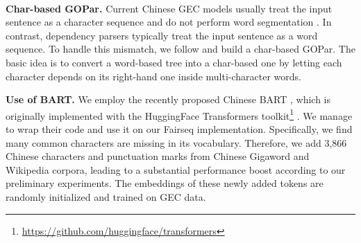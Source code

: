 \documentclass[11pt]{article}
\begin{document}
\begin{table}[tp!]\
\centering
{}
\caption{Statistics of Chinese GEC datasets.}
\label{tab:chinese:dataset}
\end{table} \textbf{Char-based GOPar.} 
Current Chinese GEC models usually treat the input sentence as a character sequence and do not perform word segmentation \cite{zhao2020maskgec}. In contrast, dependency parsers typically treat the input sentence as a word sequence. 
To handle this mismatch, we follow \citet{DBLP:journals/tacl/YanQH20}  and build a char-based GOPar. The basic idea is to convert a word-based tree into a char-based one by letting each character depends on its right-hand one  inside multi-character words. 




\textbf{Use of BART.} 
We employ the recently proposed Chinese BART \citep{shao2021cpt}, which is originally implemented with the HuggingFace Transformers toolkit\footnote{\url{https://github.com/huggingface/transformers}} \citep{wolf-etal-2020-transformers}. 
We manage to wrap their code and use it on our Fairseq implementation.
Specifically, we find  many common characters are missing in its vocabulary. Therefore, we add 3,866 Chinese characters and punctuation marks from Chinese Gigaword and Wikipedia corpora, leading to a substantial performance boost according to our preliminary experiments. The embeddings of these newly added tokens are randomly initialized and trained on GEC data.
\end{document}
